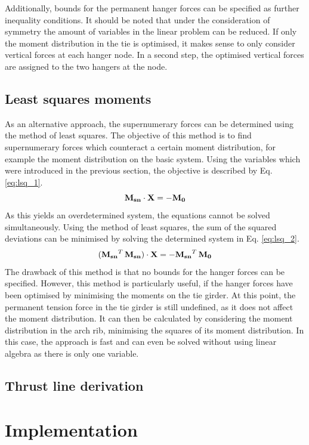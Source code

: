 Additionally, bounds for the permanent hanger forces can be specified as further inequality conditions. It should be noted that under the consideration of symmetry the amount of variables in the linear problem can be reduced. If only the moment distribution in the tie is optimised, it makes sense to only consider vertical forces at each hanger node. In a second step, the optimised vertical forces are assigned to the two hangers at the node.

\subsection{Least squares moments} \label{app:lsq}
As an alternative approach, the supernumerary forces can be determined using the method of least squares. The objective of this method is to find supernumerary forces which counteract a certain moment distribution, for example the moment distribution on the basic system. Using the variables which were introduced in the previous section, the objective is described by Eq. \eqref{eq:lsq_1}.
\begin{equation}
    {\bf M_{sn}} \cdot {\bf X} = -{\bf M_0}
    \label{eq:lsq_1}
\end{equation}
As this yields an overdetermined system, the equations cannot be solved simultaneously. Using the method of least squares, the sum of the squared deviations can be minimised by solving the determined system in Eq. \eqref{eq:lsq_2}.
\begin{equation}
    ({\bf M_{sn}}^T\,{\bf M_{sn}}) \cdot {\bf X} = -{\bf M_{sn}}^T\,{\bf M_0}
    \label{eq:lsq_2}
\end{equation}
The drawback of this method is that no bounds for the hanger forces can be specified. However, this method is particularly useful, if the hanger forces have been optimised by minimising the moments on the tie girder. At this point, the permanent tension force in the tie girder is still undefined, as it does not affect the moment distribution. It can then be calculated by considering the moment distribution in the arch rib, minimising the squares of its moment distribution. In this case, the approach is fast and can even be solved without using linear algebra as there is only one variable.

\subsection{Thrust line derivation} \label{app:thrust_line}

\section{Implementation}

